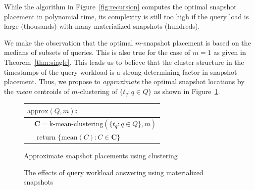 While the algorithm in Figure~\ref{fig:recursion} computes the optimal snapshot
placement in polynomial time, its complexity is still too high if the query load is
large (thousands) with many materialized snapshots (hundreds).

We make the observation that the optimal $m$-snapshot placement is based on
the medians of subsets of queries.  This is also true
for the case of $m=1$ as given in Theorem~\ref{thm:single}.
This leads us to believe that the cluster structure in the timestamps of the
query workload is a strong determining factor in snapshot placement.  Thus, we
propose to {\em approximate} the optimal snapshot locations by the {\em mean}
centroids of $m$-clustering of $\{t_q : q\in Q\}$ as shown in
Figure~\ref{fig:approx}.

\begin{figure}[htbp]
    \centering
    \begin{tabular}{l}\hline\hline
        $\mathrm{approx}(Q, m)$: \\ \hline
        \verb|  | $\mathbf{C} = \textrm{k-mean-clustering}(\{t_q: q\in Q\}, m)$ \\
        \verb|  | return $\{\mathrm{mean}(C) : C\in\mathbf{C}\}$ \\ \hline\hline
    \end{tabular}
    \caption{Approximate snapshot placements using clustering}
    \label{fig:approx}
\end{figure}
\begin{figure}[b] 
    \centering 
    \hfill 
    \hfill
    \caption{The effects of query workload answering using materialized snapshots}
    \label{fig:query-answer}
\end{figure}


